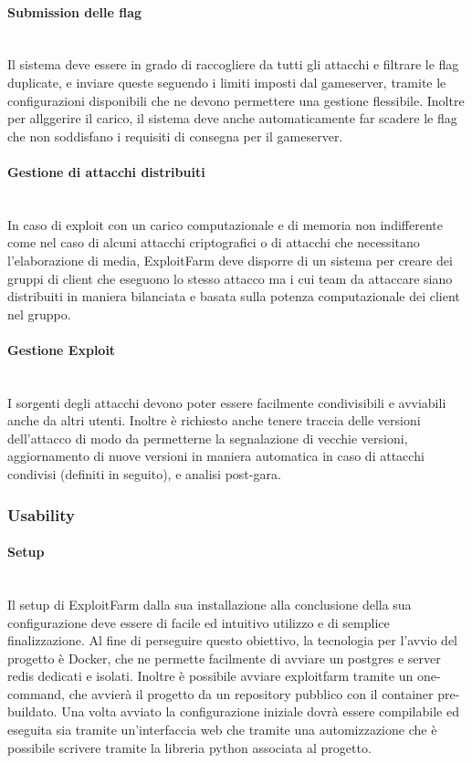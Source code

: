 \documentclass[11pt]{article}
\begin{document}
\paragraph{Submission delle flag}\mbox{}\\
Il sistema deve essere in grado di raccogliere da tutti gli attacchi e filtrare le flag duplicate, e inviare queste seguendo i limiti imposti dal gameserver, tramite le configurazioni disponibili che ne devono permettere una gestione flessibile. Inoltre per allggerire il carico, il sistema deve anche automaticamente far scadere le flag che non soddisfano i requisiti di consegna per il gameserver.
\paragraph{Gestione di attacchi distribuiti}\mbox{}\\
In caso di exploit con un carico computazionale e di memoria non indifferente come nel caso di alcuni attacchi criptografici o di attacchi che necessitano l'elaborazione di media, ExploitFarm deve disporre di un sistema per creare dei gruppi di client che eseguono lo stesso attacco ma i cui team da attaccare siano distribuiti in maniera bilanciata e basata sulla potenza computazionale dei client nel gruppo.
\paragraph{Gestione Exploit}\mbox{}\\
I sorgenti degli attacchi devono poter essere facilmente condivisibili e avviabili anche da altri utenti. Inoltre è richiesto anche tenere traccia delle versioni dell'attacco di modo da permetterne la segnalazione di vecchie versioni, aggiornamento di nuove versioni in maniera automatica in caso di attacchi condivisi (definiti in seguito), e analisi post-gara.
\subsubsection{Usability}
\paragraph{Setup}\mbox{}\\
Il setup di ExploitFarm dalla sua installazione alla conclusione della sua configurazione deve essere di facile ed intuitivo utilizzo e di semplice finalizzazione. Al fine di perseguire questo obiettivo, la tecnologia per l'avvio del progetto è Docker, che ne permette facilmente di avviare un postgres e server redis dedicati e isolati. Inoltre è possibile avviare exploitfarm tramite un one-command, che avvierà il progetto da un repository pubblico con il container pre-buildato. Una volta avviato la configurazione iniziale dovrà essere compilabile ed eseguita sia tramite un'interfaccia web che tramite una automizzazione che è possibile scrivere tramite la libreria python associata al progetto.
\end{document}
